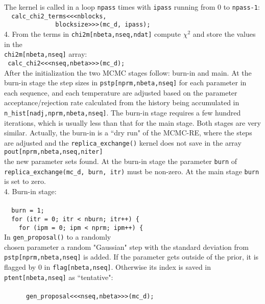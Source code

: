 \documentclass[preprint2]{aastex}
\begin{document}
The kernel is called in a loop \verb|npass| times with \verb|ipass| running from 0 to \verb|npass-1|: \\
\verb|  calc_chi2_terms<<<nblocks,| \\ 
\verb|              blocksize>>>(mc_d, ipass);| \\
    
4. From the terms in \verb|chi2m[nbeta,nseq,ndat]| compute  $\chi^2$ and store the values in the \\
\verb|chi2m[nbeta,nseq]| array: \\
\verb| calc_chi2<<<nseq,nbeta>>>(mc_d);| \\

After the initialization the two MCMC stages follow: burn-in and main. At the burn-in stage 
the step sizes in \verb|pstp[nprm,nbeta,nseq]|
for each parameter in each sequence, and each temperature are adjusted based on the parameter acceptance/rejection rate calculated from the history being accumulated in \\
\verb|n_hist[nadj,nprm,nbeta,nseq]|.
 The burn-in stage 
requires a few hundred iterations, which is usually less than that for the main stage. 
Both stages are very similar. Actually, the burn-in is a ``dry run" of the MCMC-RE, where
the steps are adjusted and 
the \verb|replica_exchange()| kernel does not save in the array \\
\verb|pout[nprm,nbeta,nseq,niter]| \\
the new parameter sets found. At the burn-in stage the parameter \verb|burn| of \\
\verb|replica_exchange(mc_d, burn, itr)| 
 must be non-zero. At the main stage \verb|burn| is set to zero. \\

4. Burn-in stage: \\\\
\verb|  burn = 1;| \\
\verb|  for (itr = 0; itr < nburn; itr++) {| \\
\verb|    for (ipm = 0; ipm < nprm; ipm++) {| \\

In \verb|gen_proposal()| to a randomly \\
chosen parameter a random "Gaussian" step with the standard deviation from 
\verb|pstp[nprm,nbeta,nseq]| is added. If the parameter gets outside of the prior, it is flagged by 0 in 
\verb|flag[nbeta,nseq]|. Otherwise its index is 
saved in
\verb|ptent[nbeta,nseq]| as ``tentative": \\ \\
\verb|      gen_proposal<<<nseq,nbeta>>>(mc_d);| \\
\end{document}
